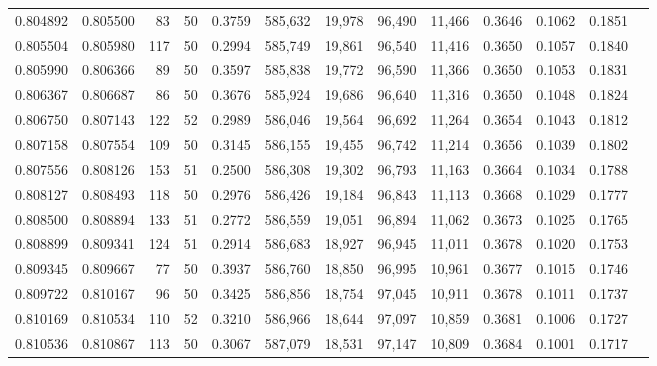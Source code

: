 \begin{tabular}{rrrrrrrrrrrrr}
0.804892 & 0.805500 &    83 &  50 &                                     0.3759 & 585,632 &  19,978 &  96,490 &  11,466 & 0.3646 & 0.1062 & 0.1851 \\
0.805504 & 0.805980 &   117 &  50 &                                     0.2994 & 585,749 &  19,861 &  96,540 &  11,416 & 0.3650 & 0.1057 & 0.1840 \\
0.805990 & 0.806366 &    89 &  50 &                                     0.3597 & 585,838 &  19,772 &  96,590 &  11,366 & 0.3650 & 0.1053 & 0.1831 \\
0.806367 & 0.806687 &    86 &  50 &                                     0.3676 & 585,924 &  19,686 &  96,640 &  11,316 & 0.3650 & 0.1048 & 0.1824 \\
0.806750 & 0.807143 &   122 &  52 &                                     0.2989 & 586,046 &  19,564 &  96,692 &  11,264 & 0.3654 & 0.1043 & 0.1812 \\
0.807158 & 0.807554 &   109 &  50 &                                     0.3145 & 586,155 &  19,455 &  96,742 &  11,214 & 0.3656 & 0.1039 & 0.1802 \\
0.807556 & 0.808126 &   153 &  51 &                                     0.2500 & 586,308 &  19,302 &  96,793 &  11,163 & 0.3664 & 0.1034 & 0.1788 \\
0.808127 & 0.808493 &   118 &  50 &                                     0.2976 & 586,426 &  19,184 &  96,843 &  11,113 & 0.3668 & 0.1029 & 0.1777 \\
0.808500 & 0.808894 &   133 &  51 &                                     0.2772 & 586,559 &  19,051 &  96,894 &  11,062 & 0.3673 & 0.1025 & 0.1765 \\
0.808899 & 0.809341 &   124 &  51 &                                     0.2914 & 586,683 &  18,927 &  96,945 &  11,011 & 0.3678 & 0.1020 & 0.1753 \\
0.809345 & 0.809667 &    77 &  50 &                                     0.3937 & 586,760 &  18,850 &  96,995 &  10,961 & 0.3677 & 0.1015 & 0.1746 \\
0.809722 & 0.810167 &    96 &  50 &                                     0.3425 & 586,856 &  18,754 &  97,045 &  10,911 & 0.3678 & 0.1011 & 0.1737 \\
0.810169 & 0.810534 &   110 &  52 &                                     0.3210 & 586,966 &  18,644 &  97,097 &  10,859 & 0.3681 & 0.1006 & 0.1727 \\
0.810536 & 0.810867 &   113 &  50 &                                     0.3067 & 587,079 &  18,531 &  97,147 &  10,809 & 0.3684 & 0.1001 & 0.1717 \\

\end{tabular}
